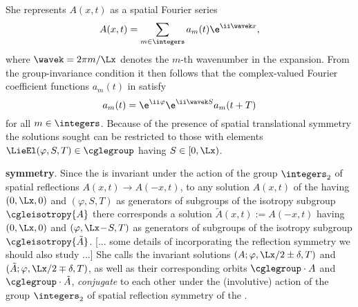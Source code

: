 \begin{description}
{She represents $A(x,t)$ as a spatial Fourier series
\begin{equation}  \label{eqn:xFseries}
     A(x,t)   =  \sum_{m \in \integers} a_{m}(t) \e^{\ii \wavek x},
\end{equation}
where $\wavek = 2\pi m / \Lx$ denotes the $m$-th wavenumber in the expansion. From
the group-invariance condition  it then
follows that the com\-plex-valued Fourier coefficient functions $a_{m}(t)$ in
 satisfy
\begin{equation}   \label{eqn:am_invariant}
a_{m}(t)  =  \e^{\ii\varphi} \e^{\ii \wavek S} a_{m}(t +T)
\end{equation}
for all $m \in \integers$.  Because of the presence of spatial translational symmetry
the solutions sought can be restricted to those with
elements $\LieEl(\varphi,S,T) \in \cglegroup$ having $S \in [0,\Lx)$.

{\bf {} symmetry}.
Since
the {\cGLe} is invariant under the action of the group $\integers_2$ of spatial
reflections $A(x,t) \rightarrow A(-x,t)$, to any solution $A(x,t)$ of the
{\cGLe} having $(0,\Lx,0)$ and $(\varphi,S,T)$ as generators of subgroups of the
isotropy subgroup $\cgleisotropy{A}$
there corresponds a solution $\tilde{A}(x,t) := A(-x,t)$ having $(0,\Lx,0)$ and
$(\varphi,\Lx\!-\!S,T)$ as generators of subgroups of the isotropy subgroup
$\cgleisotropy{\tilde{A}}$.
[... some details of incorporating the reflection symmetry we should also study ...]
She calls the invariant
solutions $(A; \varphi, \Lx/2 \pm \delta, T)$ and $(\tilde{A}; \varphi, \Lx/2
\mp \delta, T)$, as well as their corresponding orbits $\cglegroup \cdot A$ and
$\cglegroup \cdot \tilde{A}$, \textit{conjugate} to each other under the
(involutive) action of the group $\integers_2$ of spatial reflection symmetry
of the {\cGLe}.

}
\end{description}
